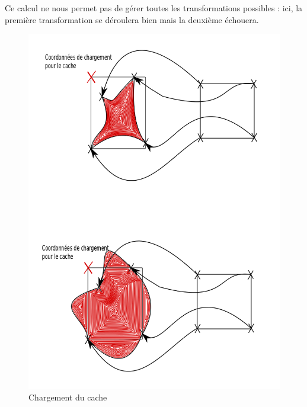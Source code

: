 \documentclass[a4paper,12pt]{report}
\begin{document}
{{{                                                                                 Ce calcul ne nous permet pas de gérer toutes les transformations possibles : ici, la première transformation se déroulera bien mais la deuxième échouera.
                                                                                 \begin{figure}[!h]
	                                                                           \centering
	                                                                           \includegraphics[scale = 0.3]{cache_proc.png}
	                                                                           \caption{Chargement du cache}
                                                                                 \end{figure}

                                                                               }




}}
\end{document}

